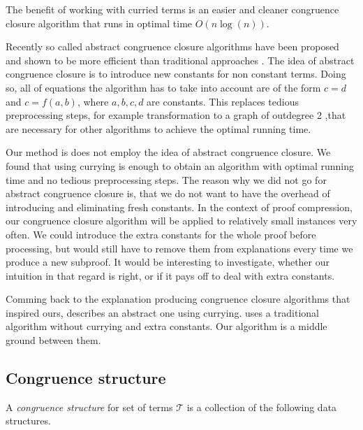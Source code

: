 The benefit of working with curried terms is an easier and cleaner congruence closure algorithm that runs in optimal time $O(n \log(n))$.

Recently so called abstract congruence closure algorithms have been proposed and shown to be more efficient than traditional approaches \cite{Bachmair2000}.
The idea of abstract congruence closure is to introduce new constants for non constant terms.
Doing so, all of equations the algorithm has to take into account are of the form $c = d$ and $c = f(a,b)$, where $a,b,c,d$ are constants.
This replaces tedious preprocessing steps, for example transformation to a graph of outdegree 2 \cite{Downey1980},that are necessary for other algorithms to achieve the optimal running time.

Our method is does not employ the idea of abstract congruence closure.
We found that using currying is enough to obtain an algorithm with optimal running time and no tedious preprocessing steps.
The reason why we did not go for abstract congruence closure is, that we do not want to have the overhead of introducing and eliminating fresh constants.
In the context of proof compression, our congruence closure algorithm will be applied to relatively small instances very often.
We could introduce the extra constants for the whole proof before processing, but would still have to remove them from explanations every time we produce a new subproof.
It would be interesting to investigate, whether our intuition in that regard is right, or if it pays off to deal with extra constants.

Comming back to the explanation producing congruence closure algorithms that inspired ours, \cite{Nieuwenhuis2005,Nieuwenhuis2007} describes an abstract one using currying.
\cite{Fontaine2004} uses a traditional algorithm without currying and extra constants.
Our algorithm is a middle ground between them.

\subsection*{Congruence structure}

A \emph{congruence structure} for set of terms $\mathcal{T}$ is a collection of the following data structures.

